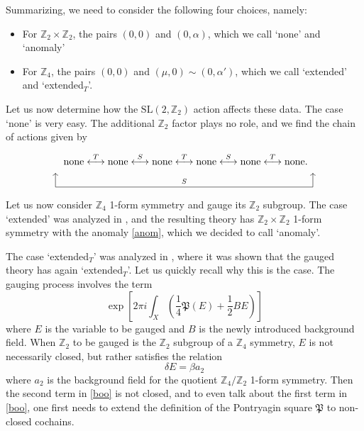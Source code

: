 \documentclass[12pt]{article}
\numberwithin{equation}{section}
\def\bZ{\mathbb{Z}}
\def\fP{\mathfrak{P}}
\def\SL{\mathrm{SL}}
\begin{document}
\def\Textended{extended$_T$}
Summarizing,  we need to consider the following four choices, namely:
\begin{itemize}
\item For $\bZ_2\times \bZ_2$, the pairs $(0,0)$ and $(0,\alpha)$, which we call `none' and `anomaly'
\item For $\bZ_4$, the pairs $(0,0)$ and $(\mu,0)\sim (0,\alpha')$, which we call `extended' and `\Textended'.
\end{itemize}


Let us now determine how the $\SL(2,\bZ_2)$ action affects these data.
The case `none' is very easy.
The additional $\bZ_2$ factor plays no role, and we find the chain of actions given by \begin{equation}
\begin{tikzpicture}
	\node at (0,0) {$
		\text{none} \stackrel{T}{\longleftrightarrow} 
		\text{none} \stackrel{S}{\longleftrightarrow} 
		\text{none} \stackrel{T}{\longleftrightarrow} 
		\text{none} \stackrel{S}{\longleftrightarrow} 
		\text{none} \stackrel{T}{\longleftrightarrow} 
		\text{none}.
	$};
	\draw[->] (-4.6,-1) -- (-4.6,-0.5);
	\draw[->] (4.5,-1) -- (4.5,-0.5);
	\draw (-4.6,-1) -- node[above] {\scriptsize $S$} (4.5,-1);
\end{tikzpicture}
\label{trivial-chain}
\end{equation}

Let us now consider $\bZ_4$ 1-form symmetry and gauge its $\bZ_2$ subgroup.
The case  `extended' was analyzed in \cite{Tachikawa:2017gyf},
and the resulting theory has $\bZ_2\times \bZ_2$ 1-form symmetry with the anomaly \eqref{anom}, 
which we decided to call `anomaly'.

The case `\Textended' was analyzed in \cite{Hsin:2020nts},
where it was shown that the gauged theory has again `\Textended'.
Let us quickly recall why this is the case. 
The gauging process involves the term
 \begin{equation}
\exp\left[2\pi i\int_X \left( \frac14 \fP(E) +\frac12 B E\right)\right]
\label{boo}
\end{equation}
where $E$ is the variable to be gauged and $B$ is the newly introduced background field.
When $\bZ_2$ to be gauged is the $\bZ_2$ subgroup of a $\bZ_4$ symmetry,
$E$ is not necessarily closed, but rather satisfies the relation \begin{equation}
\delta E = \beta a_2
\end{equation}
where $a_2$ is the background field for the quotient $\bZ_4/\bZ_2$ 1-form symmetry.
Then the second term in \eqref{boo} is not closed, 
and to even talk about the first term in \eqref{boo}, one first needs to extend the definition of the Pontryagin square $\fP$ to non-closed cochains.
\end{document}
